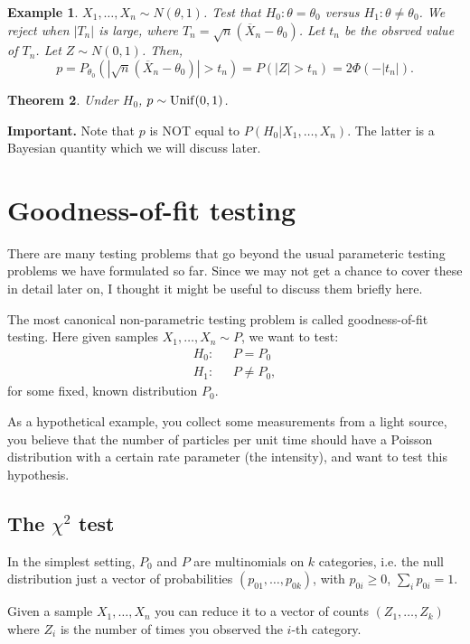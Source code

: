 \documentclass[twoside,12pt]{article}
\newcounter{lecnum}
\newtheorem{theorem}{Theorem}[lecnum]
\newtheorem{example}[theorem]{Example}
\begin{document}
\begin{example}
$X_1,\ldots, X_n \sim N(\theta,1)$.
Test that $H_0:\theta = \theta_0$ versus
$H_1:\theta \neq \theta_0$.
We reject when $|T_n|$ is large, where
$T_n = \sqrt{n}(\overline{X}_n - \theta_0)$.
Let $t_n$ be the obsrved value of $T_n$.
Let $Z\sim N(0,1)$.
Then,
$$
p = P_{\theta_0}\left( |\sqrt{n}(\overline{X}_n - \theta_0)| > t_n\right) =
P( |Z| > t_n) = 2\Phi(-|t_n|).
$$
\end{example}


\begin{theorem}
Under $H_0$,
$p\sim {\rm Unif}(0,1)$.
\end{theorem}

{\bf Important.}
Note that $p$ is NOT equal to $P(H_0|X_1,\ldots, X_n)$.
The latter is a Bayesian quantity which we will discuss later.
\section{Goodness-of-fit testing}
There are many testing problems that go beyond the usual parameteric testing problems we have formulated so far. Since we may not get a chance to cover these in detail later on, I thought it might be useful to discuss them briefly here.

The most canonical non-parametric testing problem is called goodness-of-fit testing. Here given samples $X_1,\ldots,X_n \sim P$, we want to test:
\begin{align*}
H_0: &~~~P = P_0 \\
H_1: &~~~P \neq P_0,
\end{align*}
for some fixed, known distribution $P_0$. 

As a hypothetical example, you collect some measurements from a light source, you believe that the number of particles per unit time should have a Poisson distribution with a certain rate parameter (the intensity), and want to test this hypothesis.

\subsection{The $\chi^2$ test}
In the simplest setting, $P_0$ and $P$ are multinomials on $k$ categories, i.e. the null distribution just a vector of probabilities $(p_{01},\ldots,p_{0k})$, with $p_{0i} \geq 0$, $\sum_i p_{0i} = 1$.

Given a sample $X_1,\ldots,X_n$ you can reduce it to a vector of counts $(Z_1,\ldots,Z_k)$ where $Z_i$ is the number of times you observed the $i$-th category.
\end{document}
